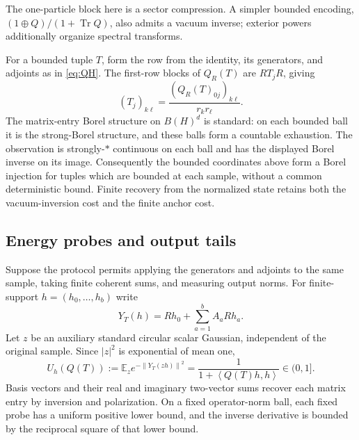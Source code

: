 \documentclass[11pt,a4paper]{amsart}
\numberwithin{equation}{section}
\theoremstyle{definition}
\theoremstyle{remark}
\newcommand{\E}{\mathbb E}
\DeclareMathOperator{\Tr}{Tr}
\newcommand{\norm}[1]{\left\lVert#1\right\rVert}
\newcommand{\ip}[2]{\left\langle#1,#2\right\rangle}
\begin{document}
The one-particle block here is a sector compression. A simpler bounded encoding, $(1\oplus Q)/(1+\Tr Q)$, also admits a vacuum inverse; exterior powers additionally organize spectral transforms.

For a bounded tuple $T$, form the row from the identity, its generators, and adjoints as in \eqref{eq:QH}. The first-row blocks of $Q_R(T)$ are $RT_jR$, giving
\[
 (T_j)_{k\ell}=\frac{(Q_R(T)_{0j})_{k\ell}}{r_kr_\ell}.
\]
The matrix-entry Borel structure on $B(H)^d$ is standard: on each bounded ball it is the strong-Borel structure, and these balls form a countable exhaustion. The observation is strongly-$*$ continuous on each ball and has the displayed Borel inverse on its image. Consequently the bounded coordinates above form a Borel injection for tuples which are bounded at each sample, without a common deterministic bound. Finite recovery from the normalized state retains both the vacuum-inversion cost and the finite anchor cost.

\subsection{Energy probes and output tails}\label{subsec:energyprobes}
Suppose the protocol permits applying the generators and adjoints to the same sample, taking finite coherent sums, and measuring output norms. For finite-support $h=(h_0,\ldots,h_b)$ write
\[
 Y_T(h)=Rh_0+\sum_{a=1}^bA_aRh_a.
\]
Let $z$ be an auxiliary standard circular scalar Gaussian, independent of the original sample. Since $|z|^2$ is exponential of mean one,
\begin{equation}\label{eq:bounded_energy_probe}
 U_h(Q(T)):=\E_z e^{-\norm{Y_T(zh)}^2}
 =\frac1{1+\ip{Q(T)h}h}\in(0,1].
\end{equation}
Basis vectors and their real and imaginary two-vector sums recover each matrix entry by inversion and polarization. On a fixed operator-norm ball, each fixed probe has a uniform positive lower bound, and the inverse derivative is bounded by the reciprocal square of that lower bound.
\end{document}
